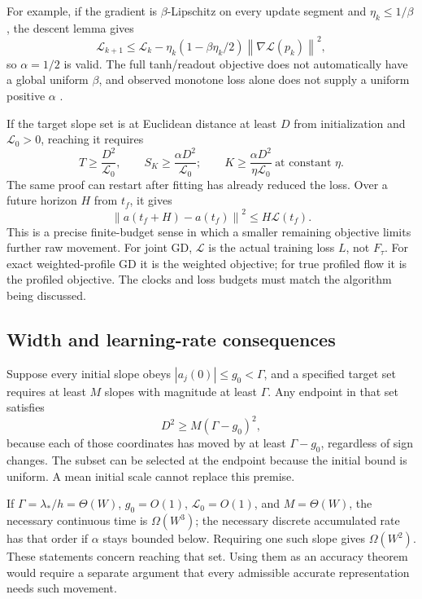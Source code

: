 \documentclass[11pt]{article}
\newcommand{\norm}[1]{\left\lVert#1\right\rVert}
\begin{document}
For example, if the gradient is $\beta$-Lipschitz on every update segment and $\eta_k\leq1/\beta$, the descent lemma gives
\begin{equation}
 \mathcal L_{k+1}\leq\mathcal L_k
 -\eta_k(1-\beta\eta_k/2)\norm{\nabla\mathcal L(p_k)}^2,
\end{equation}
so $\alpha=1/2$ is valid. The full tanh/readout objective does not automatically have a global uniform $\beta$, and observed monotone loss alone does not supply a uniform positive $\alpha$ \cite{energy}.

If the target slope set is at Euclidean distance at least $D$ from initialization and $\mathcal L_0>0$, reaching it requires
\begin{equation}
 T\geq\frac{D^2}{\mathcal L_0},\qquad
 S_K\geq\frac{\alpha D^2}{\mathcal L_0};
 \qquad K\geq\frac{\alpha D^2}{\eta\mathcal L_0}
 \ \text{at constant }\eta.
\end{equation}
The same proof can restart after fitting has already reduced the loss. Over a future horizon $H$ from $t_f$, it gives
\begin{equation}
 \norm{a(t_f+H)-a(t_f)}^2\leq H\mathcal L(t_f).
 \label{eq:remaining}
\end{equation}
This is a precise finite-budget sense in which a smaller remaining objective limits further raw movement. For joint GD, $\mathcal L$ is the actual training loss $L$, not $F_\tau$. For exact weighted-profile GD it is the weighted objective; for true profiled flow it is the profiled objective. The clocks and loss budgets must match the algorithm being discussed.

\subsection{Width and learning-rate consequences}

Suppose every initial slope obeys $|a_j(0)|\leq g_0<\Gamma$, and a specified target set requires at least $M$ slopes with magnitude at least $\Gamma$. Any endpoint in that set satisfies
\begin{equation}
 D^2\geq M(\Gamma-g_0)^2,
\end{equation}
because each of those coordinates has moved by at least $\Gamma-g_0$, regardless of sign changes. The subset can be selected at the endpoint because the initial bound is uniform. A mean initial scale cannot replace this premise.

If $\Gamma=\lambda_*/h=\Theta(W)$, $g_0=O(1)$, $\mathcal L_0=O(1)$, and $M=\Theta(W)$, the necessary continuous time is $\Omega(W^3)$; the necessary discrete accumulated rate has that order if $\alpha$ stays bounded below. Requiring one such slope gives $\Omega(W^2)$. These statements concern reaching that set. Using them as an accuracy theorem would require a separate argument that every admissible accurate representation needs such movement.
\end{document}
